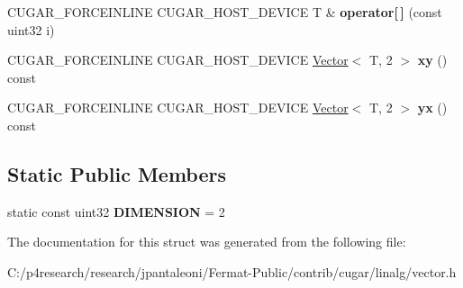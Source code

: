\begin{DoxyCompactItemize}
\item 
\mbox{\label{structcugar_1_1_vector_3_01_t_00_012_01_4_a8ac2a319134c6328df77542de493265c}} 
C\+U\+G\+A\+R\+\_\+\+F\+O\+R\+C\+E\+I\+N\+L\+I\+NE C\+U\+G\+A\+R\+\_\+\+H\+O\+S\+T\+\_\+\+D\+E\+V\+I\+CE T \& {\bfseries operator\mbox{[}$\,$\mbox{]}} (const uint32 i)
\item 
\mbox{\label{structcugar_1_1_vector_3_01_t_00_012_01_4_acf0cd7f24e2361db1fa60f5da2b45fc0}} 
C\+U\+G\+A\+R\+\_\+\+F\+O\+R\+C\+E\+I\+N\+L\+I\+NE C\+U\+G\+A\+R\+\_\+\+H\+O\+S\+T\+\_\+\+D\+E\+V\+I\+CE \hyperlink{structcugar_1_1_vector}{Vector}$<$ T, 2 $>$ {\bfseries xy} () const
\item 
\mbox{\label{structcugar_1_1_vector_3_01_t_00_012_01_4_ab6ae48541ef24401cbe6fdb260963d2d}} 
C\+U\+G\+A\+R\+\_\+\+F\+O\+R\+C\+E\+I\+N\+L\+I\+NE C\+U\+G\+A\+R\+\_\+\+H\+O\+S\+T\+\_\+\+D\+E\+V\+I\+CE \hyperlink{structcugar_1_1_vector}{Vector}$<$ T, 2 $>$ {\bfseries yx} () const
\end{DoxyCompactItemize}
\subsection*{Static Public Members}
\begin{DoxyCompactItemize}
\item 
\mbox{\label{structcugar_1_1_vector_3_01_t_00_012_01_4_acdfe9a5490b305fa7ee9a4d56d3da0cf}} 
static const uint32 {\bfseries D\+I\+M\+E\+N\+S\+I\+ON} = 2
\end{DoxyCompactItemize}


The documentation for this struct was generated from the following file\+:\begin{DoxyCompactItemize}
\item 
C\+:/p4research/research/jpantaleoni/\+Fermat-\/\+Public/contrib/cugar/linalg/vector.\+h\end{DoxyCompactItemize}
